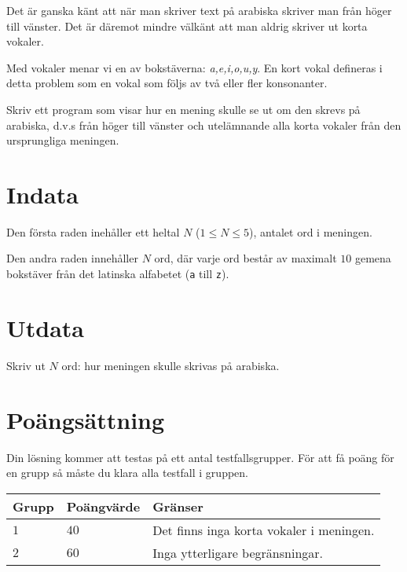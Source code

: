 Det är ganska känt att när man skriver text på arabiska skriver man från höger till vänster.
Det är däremot mindre välkänt att man aldrig skriver ut korta vokaler.

Med vokaler menar vi en av bokstäverna: \textit{a,e,i,o,u,y}.
En kort vokal defineras i detta problem som en vokal som följs av två eller fler konsonanter.

Skriv ett program som visar hur en mening skulle se ut om den skrevs på arabiska, d.v.s från höger till vänster och utelämnande alla korta vokaler från den ursprungliga meningen.

\section*{Indata}
Den första raden inehåller ett heltal $N$ ($1 \le N \le 5$), antalet ord i meningen.

Den andra raden innehåller $N$ ord, där varje ord består av maximalt $10$ gemena bokstäver från det latinska alfabetet (\texttt{a} till \texttt{z}).

\section*{Utdata}
Skriv ut $N$ ord: hur meningen skulle skrivas på arabiska.

\section*{Poängsättning}
Din lösning kommer att testas på ett antal testfallsgrupper.
För att få poäng för en grupp så måste du klara alla testfall i gruppen.

\noindent
\begin{tabular}{| l | l | l |}
  \hline
  Grupp & Poängvärde & Gränser \\ \hline
  $1$   & $40$        & Det finns inga korta vokaler i meningen. \\ \hline
  $2$   & $60$        & Inga ytterligare begränsningar. \\ \hline
\end{tabular}
